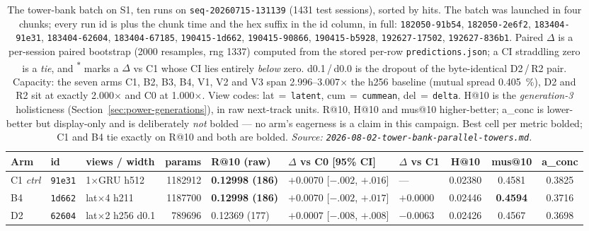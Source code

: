 \documentclass[11pt]{article}
\newcommand{\runid}[1]{\texttt{\small\seqsplit{#1}}}
\newcommand{\dsid}[1]{\texttt{\small #1}}
\newcommand{\best}[1]{\textbf{#1}}
\begin{document}
\begin{table}[ht]
  \centering
  \caption{The tower-bank batch on S1, ten runs on \dsid{seq-20260715-131139}
  (\num{1431} test sessions), sorted by hits. The batch was launched in four
  chunks; every run id is \protect\runid{run-20260802-} plus the chunk time and
  the hex suffix in the id column, in full: \texttt{182050-91b54},
  \texttt{182050-2e6f2}, \texttt{183404-91e31},
  \texttt{183404-62604}, \texttt{183404-67185},
  \texttt{190415-1d662}, \texttt{190415-90866},
  \texttt{190415-b5928}, \texttt{192627-17502},
  \texttt{192627-836b1}. Paired $\Delta$ is a per-session paired
  bootstrap (\num{2000} resamples, rng \num{1337}) computed from the stored
  per-row \texttt{predictions.json}; a CI straddling zero is a \emph{tie}, and
  \textsuperscript{$\ast$} marks a $\Delta$ vs C1 whose CI lies entirely
  \emph{below} zero. d\num{0.1}\,/\,d\num{0.0} is the dropout of the
  byte-identical D2\,/\,R2 pair. Capacity: the seven arms C1, B2, B3, B4, V1, V2
  and V3 span \numrange{2.996}{3.007}$\times$ the h256 baseline (mutual spread
  \SI{0.405}{\percent}), D2 and R2 sit at exactly \num{2.000}$\times$ and C0 at
  \num{1.000}$\times$. View codes:
  lat\,$=$\,\texttt{latent}, cum\,$=$\,\texttt{cummean},
  del\,$=$\,\texttt{delta}. H@10 is the \emph{generation-3} holisticness
  (Section~\ref{sec:power-generations}), in raw next-track units. R@10, H@10 and
  mus@10 higher-better; a\_conc is lower-better but display-only and is
  deliberately \emph{not} bolded --- no arm's eagerness is a claim in this
  campaign. Best cell per metric bolded; C1 and B4 tie exactly on R@10 and both
  are bolded.
  \emph{Source: \texttt{2026-08-02-tower-bank-parallel-towers.md}.}}
  \label{tab:towerbank-s1}
  {\scriptsize\setlength{\tabcolsep}{1.9pt}\begin{tabular}{lllrlllccc}
    \toprule
    Arm & id & views / width & params & R@10 (raw) & $\Delta$ vs C0 [95\% CI] & $\Delta$ vs C1 & H@10 & mus@10 & a\_conc \\
    \midrule
    C1 \emph{ctrl} & \texttt{91e31} & 1$\times$GRU h512 & \num{1182912} & \best{0.12998 (186)} & $+0.0070$ [$-.002$, $+.016$] & --- & 0.02380 & 0.4581 & 0.3825 \\
    B4 & \texttt{1d662} & lat$\times$4 h211 & \num{1187700} & \best{0.12998 (186)} & $+0.0070$ [$-.002$, $+.017$] & $+0.0000$ & 0.02446 & \best{0.4594} & 0.3716 \\
    D2 & \texttt{62604} & lat$\times$2 h256 d\num{0.1} & \num{789696} & 0.12369 (177) & $+0.0007$ [$-.008$, $+.008$] & $-0.0063$ & 0.02426 & 0.4567 & 0.3698 \\

\end{tabular}}
\end{table}
\end{document}
